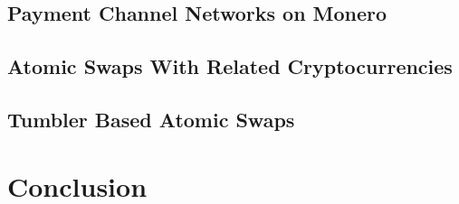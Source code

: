 \documentclass[draft,final]{vutinfth} %
\begin{document}
\section{Payment Channel Networks on Monero}
\section{Atomic Swaps With Related Cryptocurrencies}
\section{Tumbler Based Atomic Swaps}

\chapter{Conclusion}



\backmatter

\listoffigures %

\cleardoublepage %
\listoftables %

\listofalgorithms
{}

\printindex

\printglossaries



\end{document}
